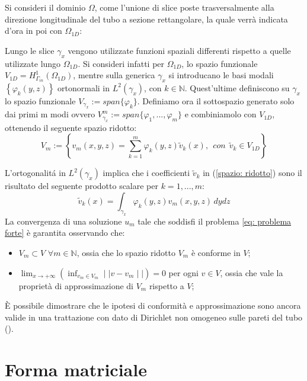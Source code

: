Si consideri il dominio $\Omega$, come l'unione di slice poste trasversalmente alla direzione longitudinale del tubo a sezione rettangolare, la quale verr\`a indicata d'ora in poi con $\Omega_{1D}$:



Lungo le slice $\gamma_x$ vengono utilizzate funzioni spaziali differenti rispetto a quelle utilizzate lungo $\Omega_{1D}$. Si consideri infatti per $\Omega_{1D}$, lo spazio funzionale $V_{1D}=H^1_{\Gamma_{in}}(\Omega_{1D})$, mentre sulla generica $\gamma_x$ si introducano le basi modali $\left\{ \varphi_k(y,z) \right\}$ ortonormali in $L^2(\gamma_x)$, con $k \in \mathbb{N}$.
Quest'ultime definiscono su $\gamma_x$ lo spazio funzionale $V_{\gamma_x}:=span\{\varphi_k\}$.
Definiamo ora il sottospazio generato solo dai primi m modi ovvero  $V^m_{\gamma_x}:=span\{\varphi_1,...,\varphi_m\}$ e combiniamolo con $V_{1D}$, ottenendo il seguente spazio ridotto:
\begin{equation}
\label{spazio: ridotto}
V_m:=\left\{v_m(x,y,z)=\sum^m_{k=1}\varphi_k(y,z)\tilde{v}_k(x) ,\:\:con\:\:\tilde{v}_k\in V_{1D}\right\}
\end{equation}

L'ortogonalit\'a in $L^2(\gamma_x)$ implica che i coefficienti  $\tilde{v}_k$ in (\ref{spazio: ridotto}) sono il risultato del seguente prodotto scalare per $k=1,...,m$:
\begin{displaymath}
\tilde{v}_k(x)=\int_{\gamma_x}\varphi_k(y,z)v_m(x,y,z)\,dydz
\end{displaymath}
La convergenza di una soluzione $u_m$ tale che soddisfi il problema \eqref{eq: problema forte} \`e garantita osservando che:
\begin{itemize}
\item $V_m \subset V$ $\forall m\in \mathbb{N}$, ossia che lo spazio ridotto $V_m$ \`e conforme in $V$;
\item $\displaystyle \lim_{x\to +\infty} \left(\inf_{v_m\in V_m}\mid\mid v-v_m\mid\mid\right)=0$ 
per ogni $v \in V$, ossia che vale la propriet\`a di approssimazione di $V_m$ rispetto a $V$;
\end{itemize}
\`E possibile dimostrare che le ipotesi di conformit\`a e approssimazione sono ancora valide in una trattazione con dato di Dirichlet non omogeneo sulle pareti del tubo
(\cite{perotto:2009}).
\clearpage
\section{Forma matriciale}

